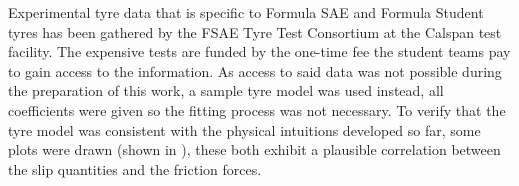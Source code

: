 Experimental tyre data that is specific to Formula SAE and Formula Student tyres has been gathered by the FSAE Tyre Test Consortium  at the Calspan test facility. The expensive tests are funded by the one-time fee the student teams pay to gain access to the information.
As access to said data was not possible during the preparation of this work, a sample tyre model was used instead, all coefficients were given so the fitting process was not necessary.
To verify that the tyre model was consistent with the physical intuitions developed so far, some plots were drawn (shown in ), these both exhibit a plausible correlation between the slip quantities and the friction forces.
